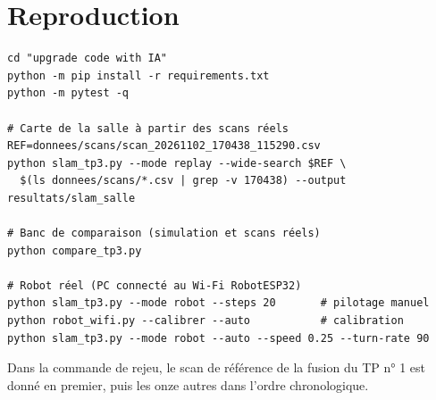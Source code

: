 \documentclass[11pt,a4paper]{article}
\begin{document}
\section{Reproduction}
\begin{lstlisting}
cd "upgrade code with IA"
python -m pip install -r requirements.txt
python -m pytest -q

# Carte de la salle à partir des scans réels
REF=donnees/scans/scan_20261102_170438_115290.csv
python slam_tp3.py --mode replay --wide-search $REF \
  $(ls donnees/scans/*.csv | grep -v 170438) --output resultats/slam_salle

# Banc de comparaison (simulation et scans réels)
python compare_tp3.py

# Robot réel (PC connecté au Wi-Fi RobotESP32)
python slam_tp3.py --mode robot --steps 20       # pilotage manuel
python robot_wifi.py --calibrer --auto           # calibration
python slam_tp3.py --mode robot --auto --speed 0.25 --turn-rate 90
\end{lstlisting}
Dans la commande de rejeu, le scan de référence de la fusion du TP n° 1 est
donné en premier, puis les onze autres dans l'ordre chronologique.
\end{document}

